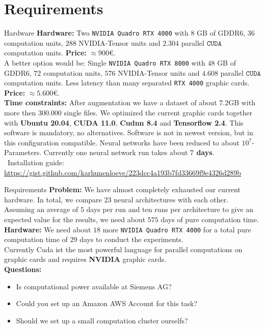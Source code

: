 \documentclass[aspectratio=169,t]{beamer}
\begin{document}
\section{Requirements}
  { 
    \begin{frame}{Hardware}
    \textbf{Hardware:} Two \texttt{NVIDIA Quadro RTX 4000} with $8$ GB of GDDR6, $36$ computation units, $288$ NVIDIA-Tensor units and $2.304$ parallel $\texttt{CUDA}$ computation units. \textbf{Price:} $\approx 900$€.\\
    A better option would be: Single \texttt{NVIDIA Quadro RTX 8000} with $48$ GB of GDDR6, $72$ computation units, $576$ NVIDIA-Tensor units and $4.608$ parallel $\texttt{CUDA}$ computation units. Less latency than many separated \texttt{RTX 4000} graphic cards. \textbf{Price:} $\approx 5.600$€.
    \\[0.2cm]
    \textbf{Time constraints:} After augmentation we have a dataset of about $7.2$GB with more then $300.000$ single files. We optimized the current graphic cards together with \textbf{Ubuntu 20.04}, \textbf{CUDA 11.0}, \textbf{Cudnn 8.4} and \textbf{Tensorflow 2.4}. This software is mandatory, no alternatives. Software is not in newest version, but in this configuration compatible. Neural networks have been reduced to about $10^7$-Parameters. Currently one neural network run takes about \textbf{$7$ days}.\\[0.2cm]
    \faGithub \ Installation guide: \href{https://gist.github.com/karhunenloeve/223dcc4a193b7fd33669f9e4326d289b}{https://gist.github.com/karhunenloeve/223dcc4a193b7fd33669f9e4326d289b}\\[0.2cm]
    \end{frame}
  }

  { 
    \begin{frame}{Requirements}
    \textbf{Problem:} We have almost completely exhausted our current hardware. In total, we compare $23$ neural architectures with each other. Assuming an average of $5$ days per run and ten runs per architecture to give an expected value for the results, we need about $575$ days of pure computation time.\\[0.2cm]

    \textbf{Hardware:} We need about $18$ more \texttt{NVIDIA Quadro RTX 4000} for a total pure computation time of $29$ days to conduct the experiments.\\
    Currently Cuda ist the most powerful language for parallel computations on graphic cards and requires \textbf{NVIDIA} graphic cards.\\[0.2cm]

    \textbf{Questions:}
    \begin{itemize}
      \item Is computational power available at Siemens AG?
      \item Could you set up an Amazon AWS Account for this task?
      \item Should we set up a small computation cluster ourselfs?
    \end{itemize}
    \end{frame}
  }
\end{document}
